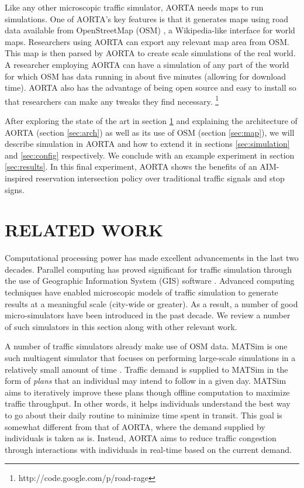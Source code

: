 \documentclass[letterpaper, 10 pt, conference]{ieeeconf}  %
\begin{document}
Like any other microscopic traffic simulator, AORTA needs maps to run
simulations. One of AORTA's key features is that it generates maps using road
data available from OpenStreetMap (OSM) \cite{osm}, a Wikipedia-like interface
for world maps. Researchers using AORTA can export any relevant map area from
OSM. This map is then parsed by AORTA to create scale simulations of the real
world. A researcher employing AORTA can have a simulation of any part of the
world for which OSM has data running in about five minutes (allowing for
download time).  AORTA also has the advantage of being open source and easy to
install so that researchers can make any tweaks they find necessary.
\footnote{http://code.google.com/p/road-rage}

After exploring the state of the art in section \ref{sec:related_work} and explaining
the architecture of AORTA (section \ref{sec:arch}) as well as its use of OSM (section \ref{sec:map}),
we will describe simulation in AORTA and how to extend it in sections \ref{sec:simulation} and
\ref{sec:config} respectively. We conclude with an example experiment in section \ref{sec:results}.
In this final experiment, AORTA shows the benefits of an AIM-inspired
\cite{JAIR08-dresner} reservation intersection policy over traditional
traffic signals and stop signs.


\section{RELATED WORK}
\label{sec:related_work}


Computational processing power has made excellent advancements in the
last two decades. Parallel computing has proved significant for
traffic simulation through the use of Geographic Information System
(GIS) software \cite{pursula1999simulation}. Advanced computing
techniques have enabled microscopic models of traffic simulation to
generate results at a meaningful scale (city-wide or greater). As a
result, a number of good micro-simulators have been introduced in the
past decade. We review a number of such simulators in this section
along with other relevant work.

A number of traffic simulators already make use of OSM data. MATSim is one such
multiagent simulator that focuses on performing large-scale simulations in a
relatively small amount of time \cite{balmer2009matsim}. Traffic demand is
supplied to MATSim in the form of \textit{plans} that an individual may intend
to follow in a given day. MATSim aims to iteratively improve these plans though
offline computation to maximize traffic throughput. In other words, it helps
individuals understand the best way to go about their daily routine to minimize
time spent in transit. This goal is somewhat different from that of AORTA,
where the demand supplied by individuals is taken as is. Instead, AORTA aims to
reduce traffic congestion through interactions with individuals in real-time
based on the current demand.
\end{document}
